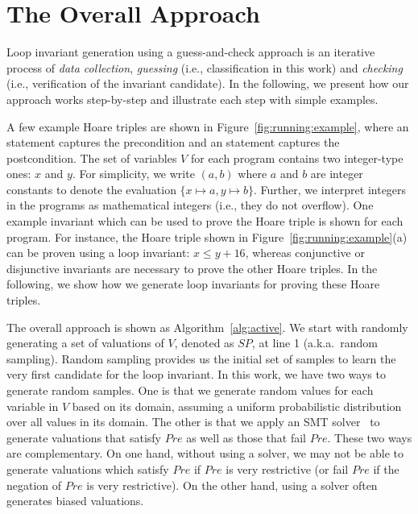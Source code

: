 \section{The Overall Approach}
\label{sec:overview}
Loop invariant generation using a guess-and-check approach is an iterative process of \emph{data collection}, \emph{guessing} (i.e., classification in this work) and \emph{checking} (i.e., verification of the invariant candidate).
In the following, we present how our approach works step-by-step and illustrate each step with simple examples.

\begin{example}
A few example Hoare triples are shown in Figure~\ref{fig:running:example}, where an  statement captures the precondition and an  statement captures the postcondition.
The set of variables $V$ for each program contains two integer-type ones: $x$ and $y$. For simplicity, we write $(a, b)$ where $a$ and $b$ are integer constants to denote the  evaluation $\{x \mapsto a, y \mapsto b\}$. Further, we interpret integers in the programs as mathematical integers (i.e., they do not overflow).
One example invariant which can be used to prove the Hoare triple is shown for each program. For instance, the Hoare triple shown in Figure~\ref{fig:running:example}(a) can be proven using a loop invariant: $x \le y + 16$, whereas conjunctive or disjunctive invariants are necessary to prove the other Hoare triples. In the following, we show how we generate loop invariants for proving these Hoare triples.
\end{example}
\noindent The overall approach is shown as Algorithm~\ref{alg:active}. We start with randomly generating a set of valuations of $V$, denoted as $SP$, at line 1 (a.k.a.~random sampling). Random sampling provides us the initial set of samples to learn the very first candidate for the loop invariant.
In this work, we have two ways to generate random samples. One is that we generate random values for each variable in $V$ based on its domain,
assuming a uniform probabilistic distribution over all values in its domain.
The other is that we apply an SMT solver~\cite{barrett2009satisfiability,de2008z3} to generate valuations that satisfy $Pre$
as well as those that fail $Pre$. These two ways are complementary.
On one hand, without using a solver, we may not be able to generate valuations which satisfy $Pre$ if $Pre$ is very restrictive
(or fail $Pre$ if the negation of $Pre$ is very restrictive). On the other hand, using a solver often generates biased valuations. %


